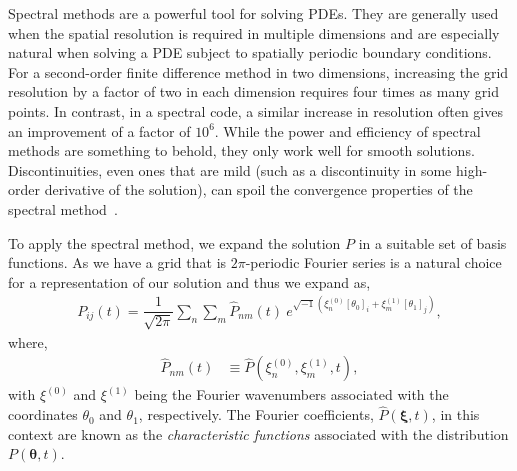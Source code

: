 \documentclass[11pt]{article}
\newcommand{\Phat}{\hat{P}}
\begin{document}
Spectral methods are a powerful tool for solving PDEs. They are generally used when the spatial resolution is required in multiple dimensions and are especially natural when solving a PDE subject to spatially periodic boundary conditions.  For a second-order finite difference method in two dimensions, increasing the grid resolution by a factor of two in each dimension requires four times as many grid points. In contrast, in a spectral code, a similar increase in resolution often gives an improvement of a factor of $10^{6}$. While the power and efficiency of spectral methods are  something to behold, they only work well 
for smooth solutions. Discontinuities, even ones that are mild (such as a discontinuity in some high-order derivative of the solution), can spoil the convergence properties of the spectral method~\cite{trefethen2000spectral}. 

To apply the spectral method, we expand the solution $P$ in a suitable set of basis functions. As we have a grid that is $2\pi$-periodic Fourier series is a natural choice for a representation of our solution and thus we expand as,
\begin{align}
    P_{ij}(t) = \dfrac{1}{\sqrt{2\pi}}\sum\limits_{n}\sum\limits_{m}\Phat_{nm}(t)\ e^{\sqrt{-1}\left(\xi^{(0)}_{n}\left[\theta_{0}\right]_{i}+\xi^{(1)}_{m}\left[\theta_{1}\right]_{j}\right)},\label{eq:fourier_rep}
\end{align}
where, 
\begin{align}
    \Phat_{nm}(t) &\equiv \Phat\left(\xi^{(0)}_{n},\xi^{(1)}_{m},t\right),
\end{align}
with $\xi^{(0)}$ and $\xi^{(1)}$ being the Fourier wavenumbers associated with the coordinates $\theta_{0}$ and $\theta_{1}$, respectively. The Fourier coefficients, $\Phat(\bm{\xi},t)$, in this context are known as the \emph{characteristic functions} associated with the distribution $P(\bm{\theta},t)$.
\end{document}
